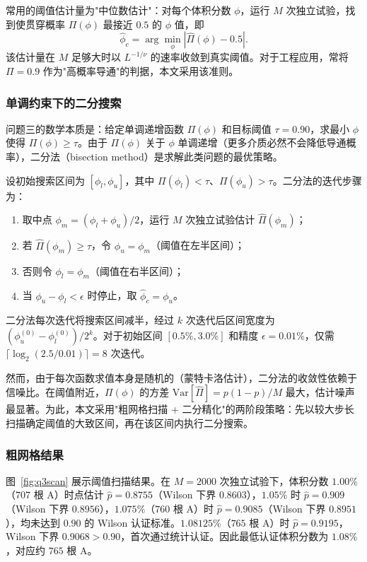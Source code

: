 \documentclass[12pt,a4paper,fontset=windows]{ctexart}
\begin{document}
常用的阈值估计量为"中位数估计"\cite{ziff2002}：对每个体积分数 $\phi$，运行 $M$ 次独立试验，找到使贯穿概率 $\Pi(\phi)$ 最接近 $0.5$ 的 $\phi$ 值，即
\begin{equation}
\hat\phi_c = \arg\min_\phi |\hat\Pi(\phi) - 0.5|.
\label{eq:median_estimator}
\end{equation}
该估计量在 $M$ 足够大时以 $L^{-1/\nu}$ 的速率收敛到真实阈值。对于工程应用，常将 $\Pi=0.9$ 作为"高概率导通"的判据，本文采用该准则。

\subsubsection{单调约束下的二分搜索}
问题三的数学本质是：给定单调递增函数 $\Pi(\phi)$ 和目标阈值 $\tau=0.90$，求最小 $\phi$ 使得 $\Pi(\phi)\ge\tau$。由于 $\Pi(\phi)$ 关于 $\phi$ 单调递增（更多介质必然不会降低导通概率），二分法（bisection method）是求解此类问题的最优策略\cite{hollender2023}。

设初始搜索区间为 $[\phi_l,\phi_u]$，其中 $\Pi(\phi_l)<\tau$、$\Pi(\phi_u)>\tau$。二分法的迭代步骤为：
\begin{enumerate}[label=(\roman*)]
\item 取中点 $\phi_m=(\phi_l+\phi_u)/2$，运行 $M$ 次独立试验估计 $\hat\Pi(\phi_m)$；
\item 若 $\hat\Pi(\phi_m)\ge\tau$，令 $\phi_u=\phi_m$（阈值在左半区间）；
\item 否则令 $\phi_l=\phi_m$（阈值在右半区间）；
\item 当 $\phi_u-\phi_l<\epsilon$ 时停止，取 $\hat\phi_c=\phi_u$。
\end{enumerate}
二分法每次迭代将搜索区间减半，经过 $k$ 次迭代后区间宽度为 $(\phi_u^{(0)}-\phi_l^{(0)})/2^k$。对于初始区间 $[0.5\%,3.0\%]$ 和精度 $\epsilon=0.01\%$，仅需 $\lceil\log_2(2.5/0.01)\rceil=8$ 次迭代。

然而，由于每次函数求值本身是随机的（蒙特卡洛估计），二分法的收敛性依赖于信噪比。在阈值附近，$\Pi(\phi)$ 的方差 $\mathrm{Var}[\hat\Pi]=p(1-p)/M$ 最大，估计噪声最显著。为此，本文采用"粗网格扫描 + 二分精化"的两阶段策略：先以较大步长扫描确定阈值的大致区间，再在该区间内执行二分搜索。

\subsubsection{粗网格结果}
图~\ref{fig:q3scan} 展示阈值扫描结果。在 $M=2000$ 次独立试验下，体积分数 $1.00\%$（$707$ 根 A）时点估计 $\hat p=0.8755$（Wilson 下界 $0.8603$），$1.05\%$ 时 $\hat p=0.909$（Wilson 下界 $0.8956$），$1.075\%$（$760$ 根 A）时 $\hat p=0.9085$（Wilson 下界 $0.8951$），均未达到 $0.90$ 的 Wilson 认证标准。$1.08125\%$（$765$ 根 A）时 $\hat p=0.9195$，Wilson 下界 $0.9068>0.90$，首次通过统计认证。因此最低认证体积分数为 $1.08\%$，对应约 $765$ 根 A。
\end{document}
